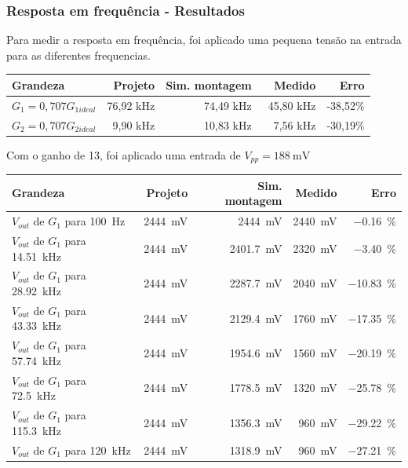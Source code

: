 \documentclass[11pt,a4paper]{article}
\begin{document}
\subsubsection{Resposta em frequência - Resultados}

Para medir a resposta em frequência, foi aplicado uma pequena tensão na entrada para as diferentes frequencias.

\begin{center}
\begin{tabular}{@{}lrrrr@{}}
\toprule
\textbf{Grandeza} & \textbf{Projeto} & \textbf{Sim. montagem} & \textbf{Medido} &
\textbf{Erro} \\
\midrule
  $G_1 = 0,707G_{1ideal}$ & 76,92 kHz & 74,49 kHz & ~45,80 kHz & -38,52\% \\
  $G_2 = 0,707G_{2ideal}$ & 9,90 kHz & 10,83 kHz & ~7,56 kHz & -30,19\% \\
\bottomrule
\end{tabular}
\end{center}

Com o ganho de 13, foi aplicado uma entrada de $V_{pp} = \SI{188}{\milli\volt} $

\begin{center}
\begin{tabular}{@{}lrrrr@{}}
\toprule
\textbf{Grandeza} & \textbf{Projeto} & \textbf{Sim. montagem} & \textbf{Medido} &
\textbf{Erro} \\
\midrule
$V_{out}$ de $G_1$ para \SI{100}{\hertz} & \SI{2444}{\milli\volt} & \SI{2444}{\milli\volt} & \SI{2440}{\milli\volt} & \SI{-0,16}{\percent} \\
$V_{out}$ de $G_1$ para \SI{14,51}{\kilo\hertz} & \SI{2444}{\milli\volt} & \SI{2401,7}{\milli\volt} & \SI{2320}{\milli\volt} & \SI{-3,40}{\percent} \\
$V_{out}$ de $G_1$ para \SI{28,92}{\kilo\hertz} & \SI{2444}{\milli\volt} & \SI{2287,7}{\milli\volt} & \SI{2040}{\milli\volt} & \SI{-10,83}{\percent} \\
$V_{out}$ de $G_1$ para \SI{43,33}{\kilo\hertz} & \SI{2444}{\milli\volt} & \SI{2129,4}{\milli\volt} & \SI{1760}{\milli\volt} & \SI{-17,35}{\percent} \\
$V_{out}$ de $G_1$ para \SI{57,74}{\kilo\hertz} & \SI{2444}{\milli\volt} & \SI{1954,6}{\milli\volt} & \SI{1560}{\milli\volt} & \SI{-20,19}{\percent} \\
$V_{out}$ de $G_1$ para \SI{72,5}{\kilo\hertz} & \SI{2444}{\milli\volt} & \SI{1778,5}{\milli\volt} & \SI{1320}{\milli\volt} & \SI{-25,78}{\percent} \\
$V_{out}$ de $G_1$ para \SI{115,3}{\kilo\hertz} & \SI{2444}{\milli\volt} & \SI{1356,3}{\milli\volt} & \SI{960}{\milli\volt} & \SI{-29,22}{\percent} \\
$V_{out}$ de $G_1$ para \SI{120}{\kilo\hertz} & \SI{2444}{\milli\volt} & \SI{1318,9}{\milli\volt} & \SI{960}{\milli\volt} & \SI{-27,21}{\percent} \\
\bottomrule
\end{tabular}
\end{center}
\end{document}
